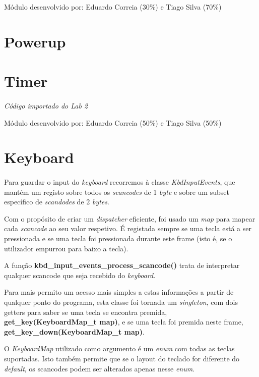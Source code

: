 \documentclass{report}
\begin{document}
Módulo desenvolvido por: Eduardo Correia (30\%) e Tiago Silva (70\%) 

\section{Powerup}

\section{Timer}

\paragraph{}
\textit{Código importado do Lab 2}\footnotemark\newline

Módulo desenvolvido por: Eduardo Correia (50\%) e Tiago Silva (50\%)

\section{Keyboard}

\paragraph{}
Para guardar o input do \textit{keyboard} recorremos à classe \textit{KbdInputEvents}, que mantém um registo sobre todos os \textit{scancodes} de 1 \textit{byte} e sobre um subset específico de \textit{scandodes} de 2 \textit{bytes}.

Com o propósito de criar um \textit{dispatcher} eficiente, foi usado um \textit{map} para mapear cada \textit{scancode} ao seu valor respetivo. É registada sempre se uma tecla está a ser pressionada e se uma tecla foi pressionada durante este frame (isto é, se o utilizador empurrou para baixo a tecla).

A função \textbf{kbd\_input\_events\_process\_scancode()} trata de interpretar qualquer scancode que seja recebido do \textit{keyboard}.

Para mais permito um acesso mais simples a estas informações a partir de qualquer ponto do programa, esta classe foi tornada um \textit{singleton}, com dois getters para saber se uma tecla se encontra premida, \textbf{get\_key(KeyboardMap\_t map)}, e se uma tecla foi premida neste frame, \textbf{get\_key\_down(KeyboardMap\_t map)}.

O \textit{KeyboardMap} utilizado como argumento é um \textit{enum} com todas as teclas suportadas. Isto também permite que se o layout do teclado for diferente do \textit{default}, os scancodes podem ser alterados apenas nesse \textit{enum}.
\end{document}
